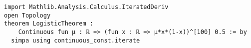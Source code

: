 \begin{lstlisting}[language=Lean]
import Mathlib.Analysis.Calculus.IteratedDeriv
open Topology
theorem LogisticTheorem :
    Continuous fun μ : ℝ => (fun x : ℝ => μ*x*(1-x))^[100] 0.5 := by
  simpa using continuous_const.iterate 
\end{lstlisting}
